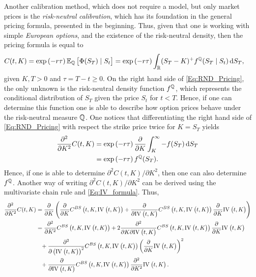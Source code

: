 Another calibration method, which does not require a model, but only market prices is the \emph{risk-neutral calibration}, which has its foundation in the general pricing formula, presented in the beginning. Thus, given that one is working with simple \emph{European options}, and the existence of the risk-neutral density, then the pricing formula is equal to
\begin{align}\label{Eq:RND_Pricing}
    C(t,K) &= \exp\left(-r\tau\right)\E[\Q]{\Phi(S_T)\mid S_t} = \exp\left(-r\tau\right)\int_\R(S_T-K)^+f^\Q(S_T\mid S_t)\,\mathrm{d}S_T,
\end{align}
given $K,T>0$ and $\tau=T-t\geq0$. On the right hand side of \eqref{Eq:RND_Pricing}, the only unknown is the risk-neutral density function $f^{\mathbb{Q}}$, which represents the conditional distribution of $S_T$ given the price $S_t$ for $t<T$. Hence, if one can determine this function one is able to describe how option prices behave under the risk-neutral measure $\mathbb{Q}$. One notices that differentiating the right hand side of \eqref{Eq:RND_Pricing} with respect the strike price twice for $K=S_T$ yields
\begin{align}\begin{aligned}\label{Eq:PartialC}
    \frac{\partial^2}{\partial K^2}C(t,K) &= \exp\left(-r\tau\right)\frac{\partial}{\partial K}\int_K^\infty -f(S_T)\,\mathrm{d}S_T\\
    &=\exp\left(-r\tau\right)f^{\mathbb{Q}}(S_T).
\end{aligned}\end{align}
Hence, if one is able to determine $\partial^2C(t,K)/\partial K^2$, then one can also determine $f^{\mathbb{Q}}$. Another way of writing $\partial^2C(t,K)/\partial K^2$ can be derived using the multivariate chain rule and \eqref{Eq:IV_formula}. Thus,
\begin{align}\begin{split}\label{Eq:RND_Derivatives}
    \frac{\partial^2}{\partial K^2} C(t,K) &= \frac{\partial}{\partial K}\left(\frac{\partial}{\partial K} C^{BS}\left(t,K,\IV{t,K}\right) + \frac{\partial}{\partial\IV{t,K}} C^{BS}\left(t,K,\IV{t,K}\right)\frac{\partial}{\partial K}\IV{t,K}\right)\\
    &= \frac{\partial^2}{\partial K^2}C^{BS}\left(t,K,\IV{t,K}\right)+2\frac{\partial^2}{\partial K\partial\IV{t,K}}C^{BS}\left(t,K,\IV{t,K}\right)\frac{\partial}{\partial K}\IV{t,K}\\
    &\phantom{=} +\frac{\partial^2}{\partial\left(\IV{t,K}\right)^2}C^{BS}\left(t,K,\IV{t,K}\right)\left(\frac{\partial}{\partial K}\IV{t,K}\right)^2\\&\phantom{=} +\frac{\partial}{\partial\IV{t,K}}C^{BS}\left(t,K,\IV{t,K}\right)\frac{\partial^2}{\partial K^2}\IV{t,K}.
\end{split}\end{align}
